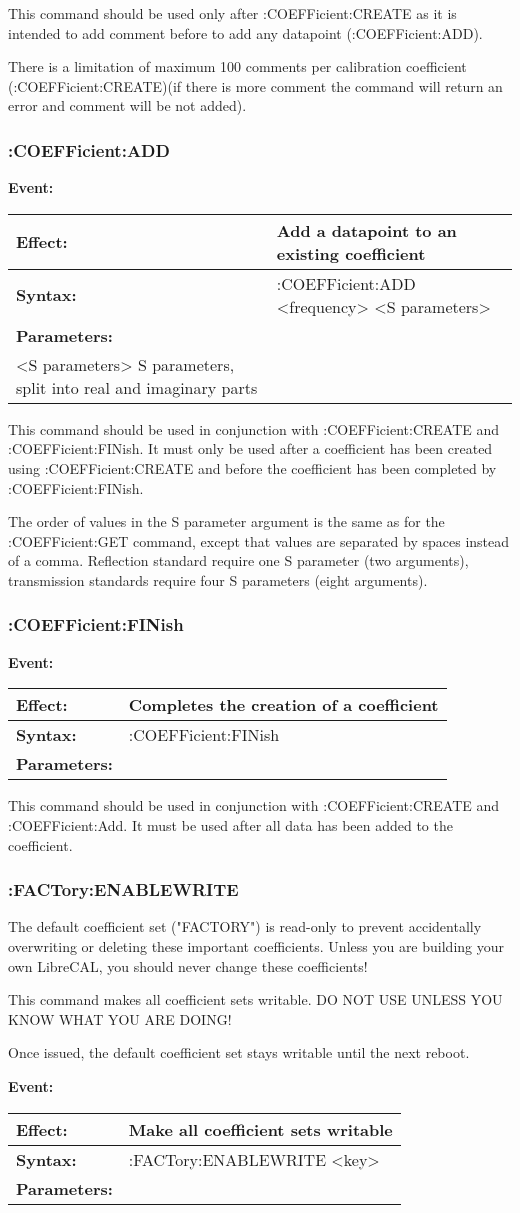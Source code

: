 \documentclass[a4paper,11pt]{article}
\newcommand{\dev}{LibreCAL}
\newcommand{\event}[3]{
\noindent\textbf{Event:}
\begin{longtable}{p{.15\textwidth} | p{.80\textwidth} } 
\hline
\textbf{Effect:} & #1 \\ \hline
\textbf{Syntax:} & #2 \\ \hline 
\textbf{Parameters:} & \makecell[Xl]{#3} \\ \hline
\end{longtable}
}
\begin{document}
This command should be used only after :COEFFicient:CREATE as it is intended to add comment before to add any datapoint (:COEFFicient:ADD).

There is a limitation of maximum 100 comments per calibration coefficient (:COEFFicient:CREATE)(if there is more comment the command will return an error and comment will be not added).
\subsubsection{:COEFFicient:ADD}
\event{Add a datapoint to an existing coefficient}{:COEFFicient:ADD <frequency> <S parameters>}{<frequency> Frequency of the datapoint, in GHz\\
<S parameters> S parameters, split into real and imaginary parts}
This command should be used in conjunction with :COEFFicient:CREATE and :COEFFicient:FINish. It must only be used after a coefficient has been created using :COEFFicient:CREATE and before the coefficient has been completed by :COEFFicient:FINish.

The order of values in the S parameter argument is the same as for the :COEFFicient:GET command, except that values are separated by spaces instead of a comma. Reflection standard require one S parameter (two arguments), transmission standards require four S parameters (eight arguments).
\subsubsection{:COEFFicient:FINish}
\event{Completes the creation of a coefficient}{:COEFFicient:FINish}{None}
This command should be used in conjunction with :COEFFicient:CREATE and :COEFFicient:Add. It must be used after all data has been added to the coefficient.

\subsubsection{:FACTory:ENABLEWRITE}
The default coefficient set ("FACTORY") is read-only to prevent accidentally overwriting or deleting these important coefficients. Unless you are building your own \dev{}, you should never change these coefficients!

This command makes all coefficient sets writable. DO NOT USE UNLESS YOU KNOW WHAT YOU ARE DOING!

Once issued, the default coefficient set stays writable until the next reboot.

\event{Make all coefficient sets writable}{:FACTory:ENABLEWRITE <key>}{<key> Prevents accidental usage, set to "I\_AM\_SURE"}
\end{document}

